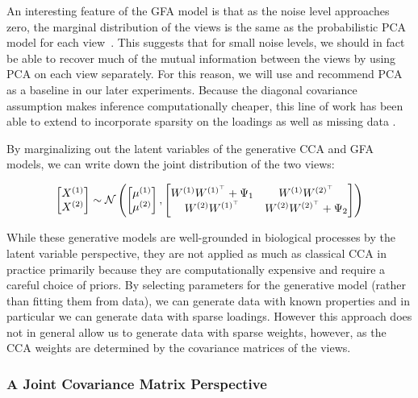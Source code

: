 An interesting feature of the GFA model is that as the noise level approaches zero, the marginal distribution of the views is the same as the probabilistic PCA model for each view~\citep{tipping1999probabilistic}.
This suggests that for small noise levels, we should in fact be able to recover much of the mutual information between the views by using PCA on each view separately.
For this reason, we will use and recommend PCA as a baseline in our later experiments.
Because the diagonal covariance assumption makes inference computationally cheaper, this line of work has been able to extend to incorporate sparsity on the loadings\citep{virtanen2011bayesian} as well as missing data \citep{ferreira2022hierarchical}.

By marginalizing out the latent variables of the generative CCA and GFA models, we can write down the joint distribution of the two views:

\begin{align}
    \begin{bmatrix} X^{(1)} \\ X^{(2)} \end{bmatrix} \sim \mathcal{N} \left( \begin{bmatrix} \mu^{(1)} \\ \mu^{(2)} \end{bmatrix}, \begin{bmatrix} W^{(1)}W^{(1)^{\top}} + \Psi_1 & W^{(1)}W^{(2)^{\top}} \\ W^{(2)}W^{(1)^{\top}} & W^{(2)}W^{(2)^{\top}} + \Psi_2 \end{bmatrix} \right)
\end{align}

While these generative models are well-grounded in biological processes by the latent variable perspective, they are not applied as much as classical CCA in practice primarily because they are computationally expensive and require a careful choice of priors.
By selecting parameters for the generative model (rather than fitting them from data), we can generate data with known properties and in particular we can generate data with sparse loadings.
However this approach does not in general allow us to generate data with sparse weights, however, as the CCA weights are determined by the covariance matrices of the views.

\subsubsection{A Joint Covariance Matrix Perspective}\label{subsubsec:a-joint-covariance-matrix-perspective}

